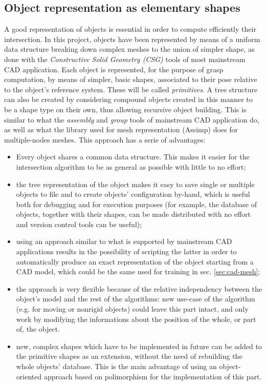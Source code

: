 \subsection{Object representation as elementary shapes} \label{sec:shapes}
A good representation of objects is essential in order to compute efficiently
their intersection. In this project, objects have been represented by means of a
uniform data structure breaking down complex meshes to the union of simpler
shape, as done with the \emph{Constructive Solid Geometry (\emph{CSG})} tools of
most mainstream CAD application. Each object is represented, for the purpose of
grasp computation, by means of simpler, basic shapes, associated to their pose
relative to the object's reference system. These will be called
\emph{primitives}. A tree structure can also be created
by considering compound objects created in this manner to be a shape type on
their own, thus allowing recursive object building. This is similar to what the
\emph{assembly} and \emph{group} tools of mainstream CAD application do, as well
as what the library used for mesh representation (Assimp) does for
multiple-nodes meshes. This approach has a serie of advantages:
\begin{itemize}
  \item{Every object shares a common data structure. This makes it easier for
      the intersection algorithm to be as general as possible with little to no
    effort;}
  \item{the tree representation of the object makes it easy to save single or
      multiple objects to file and to create objects' configuration by-hand,
      which is useful both for debugging and for execution purposes (for
      example, the database of objects, together with their shapes, can be made
    distributed with no effort and version control tools can be useful);}
  \item{using an approach similar to what is supported by mainstream CAD
      applications results in the possibility of scripting the latter in order
      to automatically produce an exact representation of the object starting
      from a CAD model, which could be the same used for training in sec.
    \ref{sec:cad-mesh};}
  \item{the approach is very flexible because of the relative independency
      between the object's model and the rest of the algorithms: new use-case of
      the algorithm (e.g. for moving or nonrigid objects) could leave this part intact, and
      only work by modifying the informations about the position of the whole,
    or part of, the object.}
  \item{new, complex shapes which have to be implemented in future can be added
      to the primitive shapes as an extension, without the need of rebuilding
      the whole objects' database. This is the main advantage of using an
      object-oriented approach based on polimorphism for the implementation of this
    part.}
\end{itemize}

